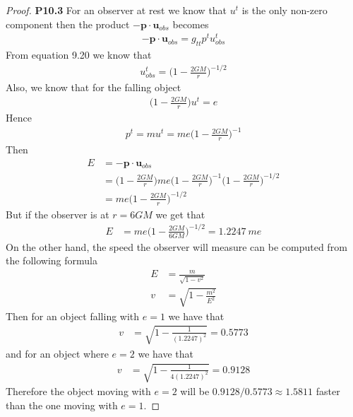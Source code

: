 \documentclass[11pt]{article}
\theoremstyle{definition}
\begin{document}
\cleardoublepage
\begin{proof}{\textbf{P10.3}}
    For an observer at rest we know that $u^t$ is the only non-zero component
    then the product $-\bm{p} \cdot \bm{u}_{obs}$ becomes
    \begin{align*}
        -\bm{p} \cdot \bm{u}_{obs} = g_{tt}p^t u^t_{obs}
    \end{align*}
    From equation 9.20 we know that
    \begin{align*}
        u^t_{obs} = \bigg(1 - \frac{2GM}{r}\bigg)^{-1/2}
    \end{align*}
    Also, we know that for the falling object
    \begin{align*}
        \bigg(1 - \frac{2GM}{r}\bigg)u^t = e
    \end{align*}
    Hence 
    \begin{align*}
        p^t = m u^t = me\bigg(1 - \frac{2GM}{r}\bigg)^{-1}
    \end{align*}
    Then
    \begin{align*}
        E &= -\bm{p} \cdot \bm{u}_{obs}\\
        &=\bigg(1 - \frac{2GM}{r}\bigg)m e\bigg(1 - \frac{2GM}{r}\bigg)^{-1}
        \bigg(1 - \frac{2GM}{r}\bigg)^{-1/2}\\
        &= m e\bigg(1 - \frac{2GM}{r}\bigg)^{-1/2}
    \end{align*}
    But if the observer is at $r = 6GM$ we get that
    \begin{align*}
        E &= m e\bigg(1 - \frac{2GM}{6GM}\bigg)^{-1/2} = 1.2247~me
    \end{align*}
    On the other hand, the speed the observer will measure can be computed from
    the following formula
    \begin{align*}
        E &= \frac{m}{\sqrt{1-v^2}}\\
        v &= \sqrt{1 -\frac{m^2}{E^2}}
    \end{align*}
    Then for an object falling with $e = 1$ we have that
    \begin{align*}
        v &= \sqrt{1 -\frac{1}{(1.2247)^2}} = 0.5773
    \end{align*}
    and for an object where $e = 2$ we have that
    \begin{align*}
        v &= \sqrt{1 -\frac{1}{4(1.2247)^2}} = 0.9128
    \end{align*}
    Therefore the object moving with $e=2$ will be
    $0.9128/0.5773 \approx 1.5811$ faster than the one moving with $e=1$.
\end{proof}
\end{document}
